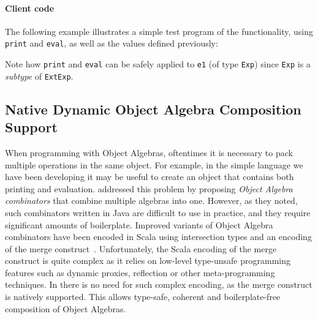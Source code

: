 \paragraph{Client code}
The following example illustrates a simple test program of the
functionality, using \lstinline{print} and \lstinline{eval}, as well
as the values defined previously:

\noindent Note how \lstinline{print} and \lstinline{eval} can be
safely applied to \lstinline{e1} (of type \lstinline{Exp}) since
\lstinline{Exp} is a \emph{subtype} of \lstinline{ExtExp}.

\subsection{Native Dynamic Object Algebra Composition Support}
\label{sec:dynamic}

When programming with Object Algebras, oftentimes it is
necessary to pack multiple operations in the same object. For example,
in the simple language we have been developing it may be useful to
create an object that contains both printing and evaluation.
\citet{oliveira2012extensibility} addressed this problem by proposing
\textit{Object Algebra combinators} that combine multiple algebras into one.
However, as they noted, such combinators written in Java are difficult to use in
practice, and they require significant amounts of boilerplate. Improved variants
of Object Algebra combinators have been encoded in Scala using intersection
types and an encoding of the merge construct~\cite{oliveira2013feature,
  rendel14attributes}. Unfortunately, the Scala encoding of the merge construct
is quite complex as it relies on low-level type-unsafe programming features such
as dynamic proxies, reflection or other meta-programming techniques. In \name
there is no need for such complex encoding, as the merge construct is natively
supported. This allows type-safe, coherent and boilerplate-free composition of
Object Algebras.

